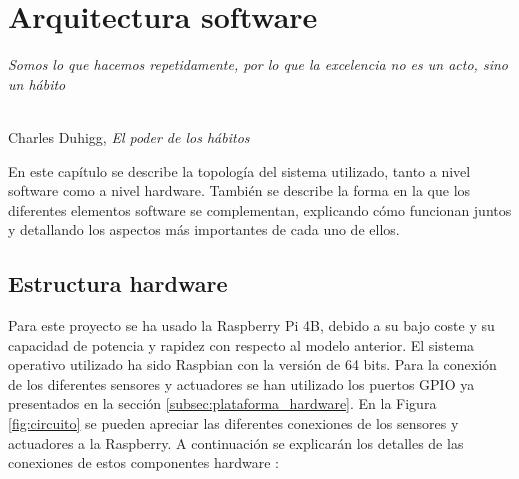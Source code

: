 \chapter{Arquitectura software}
\label{cap:capitulo5}

\begin{flushright}
\begin{minipage}[]{10cm}
\emph{Somos lo que hacemos repetidamente, por lo que la excelencia no es un acto, sino un hábito}\\
\end{minipage}\\

Charles Duhigg, \textit{El poder de los hábitos}\\
\end{flushright}

\vspace{1cm}


En este capítulo se describe la topología del sistema utilizado, tanto a nivel software como a nivel hardware. También se describe la forma en la que los diferentes elementos software se complementan, explicando cómo funcionan juntos y detallando los aspectos más importantes de cada uno de ellos.


\section{Estructura hardware}
\label{sec:estructura_hardware}


Para este proyecto se ha usado la Raspberry Pi 4B, debido a su bajo coste y su capacidad de potencia y rapidez con respecto al modelo anterior. El sistema operativo utilizado ha sido Raspbian con la versión de 64 bits. Para la conexión de los diferentes sensores y actuadores se han utilizado los puertos GPIO ya presentados en la sección \ref{subsec:plataforma_hardware}. En la Figura \ref{fig:circuito} se pueden apreciar las diferentes conexiones de los sensores y actuadores a la Raspberry. A continuación se explicarán los detalles de las conexiones de estos componentes hardware :


